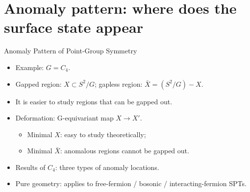 \documentclass[xcolor=table, 11pt, aspectratio=169]{beamer}
\begin{document}
    \section{Anomaly pattern: where does the surface state appear}

    \begin{frame}{Anomaly Pattern of Point-Group Symmetry}
      \begin{itemize}
        \item<1-> Example: $G=C_4$.
        \item<2-> Gapped region: $X\subset S^2/G$; gapless region: $\bar X=(S^2/G) - X$.
        \item<2-> It is easier to study regions that can be gapped out.
        \item<3-> Deformation: G-equivariant map $X\rightarrow X'$.
        \begin{itemize}
          \item<4-> Minimal $X$: easy to study theoretically;
          \item<5-> Minimal $\bar X$: anomalous regions cannot be gapped out.
        \end{itemize}
        \item<6-> Results of $C_4$: three types of anomaly locations.
        \item<7-> Pure geometry: applies to free-fermion / bosonic / interacting-fermion SPTs.
      \end{itemize}
      \begin{center}
        \hspace{2em}
        \begin{animateinline}{30}
\end{animateinline}
\end{center}
\end{frame}
\end{document}
